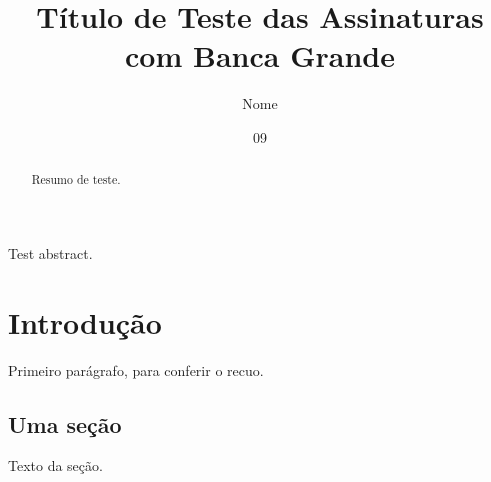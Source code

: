 \documentclass[dsc,assinaturas]{coppe}
\title{Título de Teste das Assinaturas com Banca Grande}
\author{Nome}{de Teste}
\date{09}{2026}
\begin{document}
  \maketitle
  \frontmatter
  \begin{abstract}
    Resumo de teste.
  \end{abstract}
  \begin{foreignabstract}
    Test abstract.
  \end{foreignabstract}
  \tableofcontents
  \mainmatter
  \chapter{Introdução}
    Primeiro parágrafo, para conferir o recuo.
  \section{Uma seção}
    Texto da seção.
\end{document}
